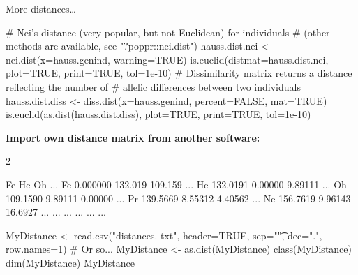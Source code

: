 \documentclass[compress, xelatex, 11pt, xcolor=svgnames, aspectratio=169, url={hyphens, lowtilde}]{beamer}
\begin{document}
\begin{frame}[fragile]{More distances\ldots}
	\begin{spluscode}
    # Nei's distance (very popular, but not Euclidean) for individuals
    # (other methods are available, see "?poppr::nei.dist")
    hauss.dist.nei <- nei.dist(x=hauss.genind, warning=TRUE)
    is.euclid(distmat=hauss.dist.nei, plot=TRUE, print=TRUE, tol=1e-10)
    # Dissimilarity matrix returns a distance reflecting the number of
    # allelic differences between two individuals
    hauss.dist.diss <- diss.dist(x=hauss.genind, percent=FALSE, mat=TRUE)
    is.euclid(as.dist(hauss.dist.diss), plot=TRUE, print=TRUE, tol=1e-10)
	\end{spluscode}
	\vfill
	\textbf{Import own distance matrix from another software:}
	\begin{multicols}{2}
		\begin{spluscode}
              Fe      He      Oh ...
    Fe  0.000000 132.019 109.159 ...
    He  132.0191 0.00000 9.89111 ...
    Oh  109.1590 9.89111 0.00000 ...
    Pr  139.5669 8.55312 4.40562 ...
    Ne  156.7619 9.96143 16.6927 ...
    ...      ...     ...     ... ...
		\end{spluscode}
		\columnbreak
		\begin{spluscode}
    MyDistance <- read.csv("distances.
      txt", header=TRUE, sep="\t",
      dec=".", row.names=1) # Or so...
    MyDistance <- as.dist(MyDistance)
    class(MyDistance)
    dim(MyDistance)
    MyDistance
		\end{spluscode}
	\end{multicols}
\end{frame}
\end{document}
